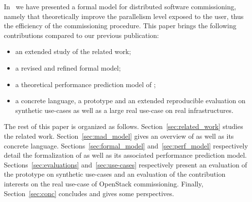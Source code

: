 
In~\cite{chardet:hal-01858150} we have presented a formal model for
distributed software commissioning, namely \mad that theoretically
improve the parallelism level exposed to the user, thus the efficiency
of the commissioning procedure. This paper brings the following
contributions compared to our previous publication:
\begin{itemize}
\item an extended study of the related work;
\item a revised and refined \mad formal model;
\item a theoretical performance prediction model of \mad;
\item a concrete language, a prototype and an extended reproducible
  evaluation on synthetic use-cases as well as a large real use-case
  on real infrastructures.
\end{itemize}

The rest of this paper is organized as
follows. Section~\ref{sec:related_work} studies the related
work. Section~\ref{sec:mad_model} gives an overview of \mad as well as
its concrete language. Sections~\ref{sec:formal_model}
and~\ref{sec:perf_model} respectively detail the formalization of \mad
as well as its associated performance prediction
model. Sections~\ref{sec:evaluations} and~\ref{sec:use-cases}
respectively present an evaluation of the \mad prototype on synthetic
use-cases and an evaluation of the contribution interests on the real
use-case of OpenStack commissioning.  Finally, Section~\ref{sec:conc}
concludes and gives some perspectives.

